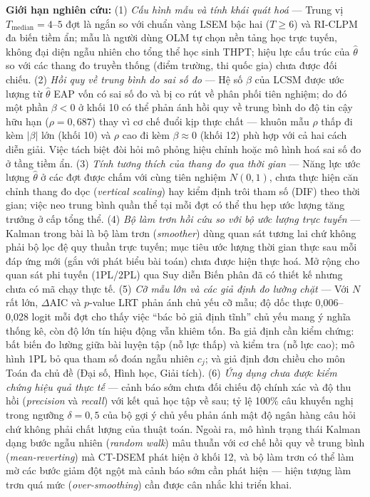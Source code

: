\textbf{Giới hạn nghiên cứu:} (1) \emph{Cấu hình mẫu và tính khái quát hoá} --- Trung vị \(T_{\mathrm{median}} = 4\text{--}5\) đợt là ngắn so với chuẩn vàng LSEM bậc hai (\(T \ge 6\)) và RI-CLPM đa biến tiềm ẩn; mẫu là người dùng OLM tự chọn nền tảng học trực tuyến, không đại diện ngẫu nhiên cho tổng thể học sinh THPT; hiệu lực cấu trúc của \(\hat\theta\) so với các thang đo truyền thống (điểm trường, thi quốc gia) chưa được đối chiếu. (2) \emph{Hồi quy về trung bình do sai số đo} --- Hệ số \(\beta\) của LCSM được ước lượng từ \(\hat\theta\) EAP vốn có sai số đo và bị co rút về phân phối tiên nghiệm; do đó một phần \(\beta < 0\) ở khối 10 có thể phản ánh hồi quy về trung bình do độ tin cậy hữu hạn (\(\rho = 0{,}687\)) thay vì cơ chế đuổi kịp thực chất --- khuôn mẫu \(\rho\) thấp đi kèm \(|\beta|\) lớn (khối 10) và \(\rho\) cao đi kèm \(\beta \approx 0\) (khối 12) phù hợp với cả hai cách diễn giải. Việc tách biệt đòi hỏi mô phỏng hiệu chỉnh hoặc mô hình hoá sai số đo ở tầng tiềm ẩn. (3) \emph{Tính tương thích của thang đo qua thời gian} --- Năng lực ước lượng \(\hat\theta\) ở các đợt được chấm với cùng tiên nghiệm \(N(0,1)\), chưa thực hiện căn chỉnh thang đo dọc (\emph{vertical scaling}) hay kiểm định trôi tham số (DIF) theo thời gian; việc neo trung bình quần thể tại mỗi đợt có thể thu hẹp ước lượng tăng trưởng ở cấp tổng thể. (4) \emph{Bộ làm trơn hồi cứu so với bộ ước lượng trực tuyến} --- Kalman trong bài là bộ làm trơn (\emph{smoother}) dùng quan sát tương lai chứ không phải bộ lọc đệ quy thuần trực tuyến; mục tiêu ước lượng thời gian thực sau mỗi đáp ứng mới (gắn với phát biểu bài toán) chưa được hiện thực hoá. Mở rộng cho quan sát phi tuyến (1PL/2PL) qua Suy diễn Biến phân đã có thiết kế nhưng chưa có mã chạy thực tế. (5) \emph{Cỡ mẫu lớn và các giả định đo lường chặt} --- Với \(N\) rất lớn, \(\Delta\)AIC và \(p\)-value LRT phản ánh chủ yếu cỡ mẫu; độ dốc thực 0{,}006--0{,}028 logit mỗi đợt cho thấy việc ``bác bỏ giả định tĩnh'' chủ yếu mang ý nghĩa thống kê, còn độ lớn tín hiệu động vẫn khiêm tốn. Ba giả định cần kiểm chứng: bất biến đo lường giữa bài luyện tập (nỗ lực thấp) và kiểm tra (nỗ lực cao); mô hình 1PL bỏ qua tham số đoán ngẫu nhiên \(c_j\); và giả định đơn chiều cho môn Toán đa chủ đề (Đại số, Hình học, Giải tích). (6) \emph{Ứng dụng chưa được kiểm chứng hiệu quả thực tế} --- cảnh báo sớm chưa đối chiếu độ chính xác và độ thu hồi (\emph{precision} và \emph{recall}) với kết quả học tập về sau; tỷ lệ 100\% câu khuyến nghị trong ngưỡng \(\delta = 0{,}5\) của bộ gợi ý chủ yếu phản ánh mật độ ngân hàng câu hỏi chứ không phải chất lượng của thuật toán. Ngoài ra, mô hình trạng thái Kalman dạng bước ngẫu nhiên (\emph{random walk}) mâu thuẫn với cơ chế hồi quy về trung bình (\emph{mean-reverting}) mà CT-DSEM phát hiện ở khối 12, và bộ làm trơn có thể làm mờ các bước giảm đột ngột mà cảnh báo sớm cần phát hiện --- hiện tượng làm trơn quá mức (\emph{over-smoothing}) cần được cân nhắc khi triển khai.
